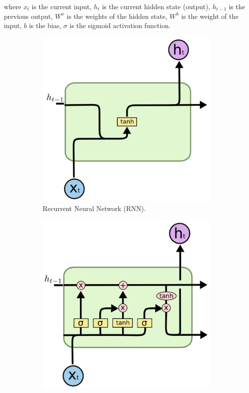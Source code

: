 \noindent
where $x_t$ is the current input, $h_t$ is the current hidden state (output), $h_{t-1}$ is the previous output, $W^x$ is the weights of the hidden state, $W^h$ is the weight of the input, $b$ is the bias, $\sigma$ is the sigmoid activation function.

\begin{figure}[!ht]
    \centering
    \begin{subfigure}[t]{0.45\textwidth}
      \includegraphics[width=\linewidth]{imgs/models/rnn-2.png}
      \caption{Recurrent Neural Network (RNN).} \label{fig:rnn}
    \end{subfigure}
    \begin{subfigure}[t]{0.45\textwidth}
      \includegraphics[width=\linewidth]{imgs/models/lstm-2.png}

\end{subfigure}
\end{figure}
